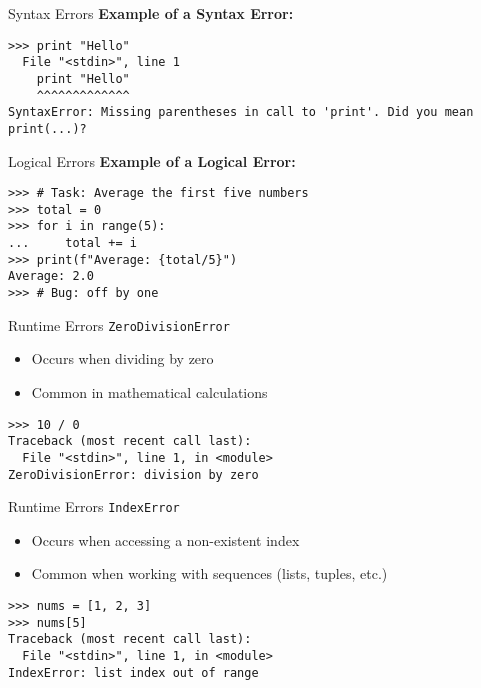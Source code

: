 \documentclass[aspectratio=169]{beamer}
\begin{document}
\begin{frame}[fragile]{Syntax Errors}
    \textbf{Example of a Syntax Error:}
    \pause
    \begin{lstlisting}
>>> print "Hello"
  File "<stdin>", line 1
    print "Hello"
    ^^^^^^^^^^^^^
SyntaxError: Missing parentheses in call to 'print'. Did you mean print(...)?
    \end{lstlisting}
\end{frame}

\begin{frame}[fragile]{Logical Errors}
    \textbf{Example of a Logical Error:}
    \pause
    \begin{lstlisting}
>>> # Task: Average the first five numbers
>>> total = 0
>>> for i in range(5):
...     total += i
>>> print(f"Average: {total/5}")
Average: 2.0
>>> # Bug: off by one
    \end{lstlisting}
\end{frame}

\begin{frame}[fragile]{Runtime Errors}
    \texttt{ZeroDivisionError}
    \begin{itemize}[<+->]
        \item Occurs when dividing by zero
        \item Common in mathematical calculations
    \end{itemize}
    \pause
    \begin{lstlisting}
>>> 10 / 0
Traceback (most recent call last):
  File "<stdin>", line 1, in <module>
ZeroDivisionError: division by zero
    \end{lstlisting}
\end{frame}

\begin{frame}[fragile]{Runtime Errors}
    \texttt{IndexError}
    \begin{itemize}[<+->]
        \item Occurs when accessing a non-existent index
        \item Common when working with sequences (lists, tuples, etc.)
    \end{itemize}
    \pause
    \begin{lstlisting}
>>> nums = [1, 2, 3]
>>> nums[5]
Traceback (most recent call last):
  File "<stdin>", line 1, in <module>
IndexError: list index out of range
    \end{lstlisting}
\end{frame}
\end{document}
